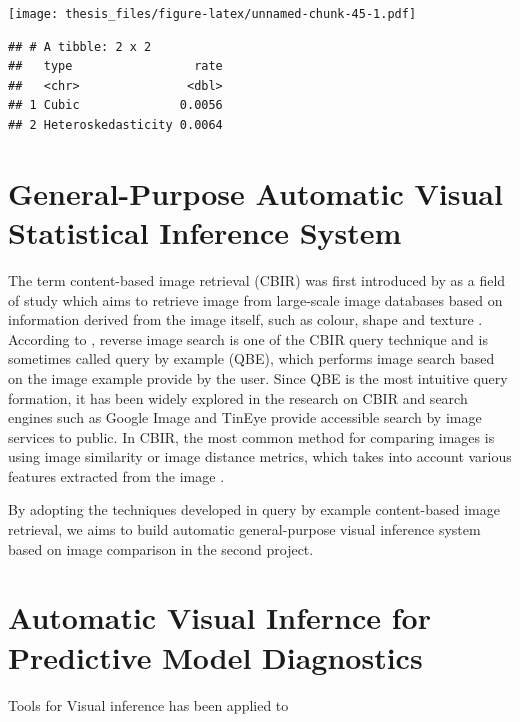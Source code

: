 \documentclass{monashthesis}
\theoremstyle{definition}
\theoremstyle{definition}
\theoremstyle{definition}
\theoremstyle{definition}
\theoremstyle{remark}
\begin{document}
\texttt{[image: thesis\_files/figure-latex/unnamed-chunk-45-1.pdf]}

\begin{verbatim}
## # A tibble: 2 x 2
##   type                 rate
##   <chr>               <dbl>
## 1 Cubic              0.0056
## 2 Heteroskedasticity 0.0064
\end{verbatim}

\hypertarget{general-purpose-automatic-visual-statistical-inference-system}{%
\chapter{General-Purpose Automatic Visual Statistical Inference System}\label{general-purpose-automatic-visual-statistical-inference-system}}

The term content-based image retrieval (CBIR) was first introduced by \textcite{kato_database_1992} as a field of study which aims to retrieve image from large-scale image databases based on information derived from the image itself, such as colour, shape and texture \autocite{rafiee_review_2010}. According to \textcite{zhou_recent_2017}, reverse image search is one of the CBIR query technique and is sometimes called query by example (QBE), which performs image search based on the image example provide by the user. Since QBE is the most intuitive query formation, it has been widely explored in the research on CBIR and search engines such as Google Image \autocite{google_google_2022} and TinEye \autocite{tineye_tineye_2022} provide accessible search by image services to public. In CBIR, the most common method for comparing images is using image similarity or image distance metrics, which takes into account various features extracted from the image \autocite{zhou_recent_2017}.

By adopting the techniques developed in query by example content-based image retrieval, we aims to build automatic general-purpose visual inference system based on image comparison in the second project.

\hypertarget{automatic-visual-infernce-for-predictive-model-diagnostics}{%
\chapter{Automatic Visual Infernce for Predictive Model Diagnostics}\label{automatic-visual-infernce-for-predictive-model-diagnostics}}

Tools for Visual inference has been applied to
\end{document}
